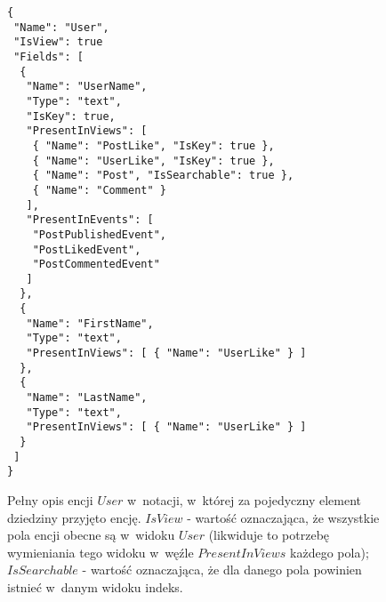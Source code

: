 \begin{figure}[!ht]
\begin{verbatim}
{
 "Name": "User",
 "IsView": true
 "Fields": [
  {
   "Name": "UserName",
   "Type": "text",
   "IsKey": true,
   "PresentInViews": [
    { "Name": "PostLike", "IsKey": true },
    { "Name": "UserLike", "IsKey": true },
    { "Name": "Post", "IsSearchable": true },
    { "Name": "Comment" }
   ],
   "PresentInEvents": [
    "PostPublishedEvent",
    "PostLikedEvent",
    "PostCommentedEvent"
   ]
  },
  {
   "Name": "FirstName",
   "Type": "text",
   "PresentInViews": [ { "Name": "UserLike" } ]
  },
  {
   "Name": "LastName",
   "Type": "text",
   "PresentInViews": [ { "Name": "UserLike" } ]
  }
 ]
}
\end{verbatim}
\caption{
 Pełny opis encji $User$ w~notacji, w~której za pojedyczny element dziedziny przyjęto encję.
 $IsView$ - wartość oznaczająca, że wszystkie pola encji obecne są w~widoku $User$ (likwiduje to potrzebę wymieniania tego widoku w~węźle $PresentInViews$ każdego pola); $IsSearchable$ - wartość oznaczająca, że dla danego pola powinien istnieć w~danym widoku indeks.
}
\label{fig:single:model_presentIn}
\end{figure}
